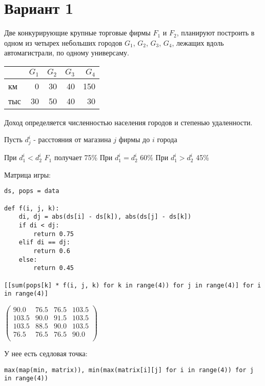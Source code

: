 \documentclass[11pt]{article}
\author{megabluejay}
\date{}
\title{}
\begin{document}
\section*{Вариант 1}
\label{sec:orgc0348c7}

Две конкурирующие крупные торговые фирмы \(F_1\) и \(F_2\), планируют построить в одном из четырех небольших городов \(G_1\), \(G_2\), \(G_3\), \(G_4\), лежащих вдоль автомагистрали, по одному универсаму.

\begin{table}[htbp]
\label{data1}
\centering
\begin{tabular}{lrrrr}
 & \(G_1\) & \(G_2\) & \(G_3\) & \(G_4\)\\[0pt]
\hline
км & 0 & 30 & 40 & 150\\[0pt]
тыс & 30 & 50 & 40 & 30\\[0pt]
\end{tabular}
\end{table}


Доход определяется численностью населения городов и степенью удаленности.

Пусть \(d_j^i\) - расстояния от магазина \(j\) фирмы до \(i\) города

При \(d_1^i < d_2^i\) \(F_1\) получает 75\%
При \(d_1^i = d_2^i\) 60\%
При \(d_1^i > d_2^i\) 45\%

Матрица игры:

\begin{verbatim}
ds, pops = data

def f(i, j, k):
    di, dj = abs(ds[i] - ds[k]), abs(ds[j] - ds[k])
    if di < dj:
        return 0.75
    elif di == dj:
        return 0.6
    else:
        return 0.45

[[sum(pops[k] * f(i, j, k) for k in range(4)) for j in range(4)] for i in range(4)]
\end{verbatim}

\(\begin{pmatrix}
 90.0 & 76.5 & 76.5 & 103.5 \\[0pt]
 103.5 & 90.0 & 91.5 & 103.5 \\[0pt]
 103.5 & 88.5 & 90.0 & 103.5 \\[0pt]
 76.5 & 76.5 & 76.5 & 90.0 \\[0pt]
\end{pmatrix}
\)

У нее есть седловая точка:

\begin{verbatim}
max(map(min, matrix)), min(max(matrix[i][j] for i in range(4)) for j in range(4))
\end{verbatim}
\end{document}
